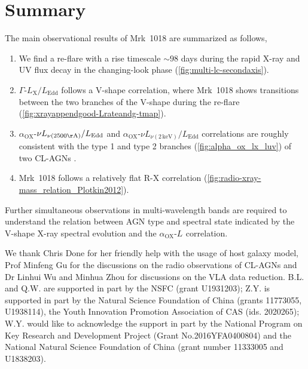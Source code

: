 \documentclass[twocolumn]{aastex63}
\newcommand{\alphaox}{$\alpha_\mathrm{OX}$}
\begin{document}
\section{Summary}
\label{sec:conclusion}
The main observational results of Mrk~1018 are summarized as follows,
\begin{enumerate}
\item We find a re-flare with a rise timescale $\sim 98$ days during the rapid X-ray and UV flux decay in the changing-look phase (\autoref{fig:multi-lc-secondaxis}).

\item $\Gamma$-$L_\mathrm{X}/L_\mathrm{Edd}$ follows a V-shape correlation, where Mrk~1018 shows transitions between the two branches of the V-shape during the re-flare (\autoref{fig:xrayappendgood-Lrateandg-tmap}).

\item  \alphaox-$\nu L_{\nu(\mathrm{2500 \AA})}/L_\mathrm{Edd}$ and \alphaox-$\nu L_{\nu(\mathrm{2\,keV})}/L_\mathrm{Edd}$ correlations are roughly consistent with the type 1 and type 2 branches (\autoref{fig:alpha_ox_lx_luv}) of two CL-AGNs \citep[see][]{2019arXiv190904676R}.

\item Mrk~1018 follows a relatively flat R-X correlation (\autoref{fig:radio-xray-mass_relation_Plotkin2012}). 

\end{enumerate}
Further simultaneous observations in multi-wavelength bands are required to understand the relation between AGN type and spectral state indicated by the V-shape X-ray spectral evolution and the \alphaox-${L_\mathrm{}}$ correlation. 



\acknowledgments
\vspace{5mm}

We thank Chris Done for her friendly help with the usage of host galaxy model, Prof Minfeng Gu for the discussions on the radio observations of CL-AGNs and Dr Linhui Wu and Minhua Zhou for discussions on the VLA data reduction. B.L. and Q.W. are supported in part by the NSFC (grant U1931203); Z.Y. is supported in part by the Natural Science Foundation of China (grants 11773055, U1938114), the Youth Innovation Promotion Association of CAS (ids. 2020265); W.Y. would like to acknowledge the support in part by the National Program on Key Research and Development Project (Grant No.2016YFA0400804) and the National Natural Science Foundation of China (grant number 11333005 and U1838203).
\end{document}
